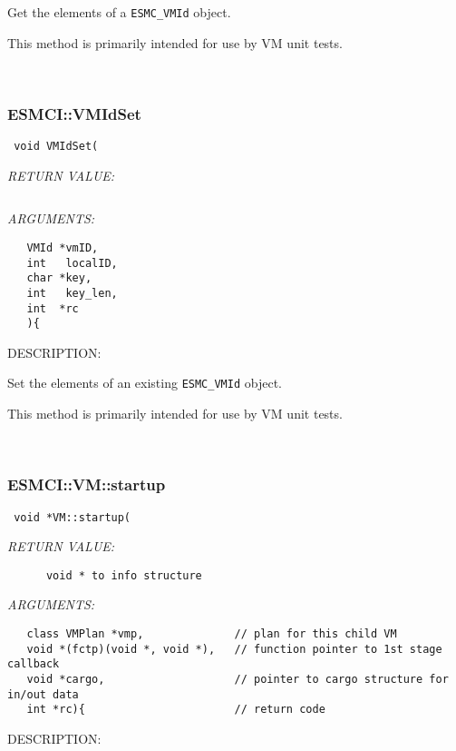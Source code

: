       Get the elements of a {\tt ESMC\_VMId} object.
  
      This method is primarily intended for use by VM unit tests.
   
 
\mbox{}\hrulefill\
 
\subsubsection [ESMCI::VMIdSet] {ESMCI::VMIdSet}


  
\begin{verbatim} void VMIdSet(\end{verbatim}{\em RETURN VALUE:}
\begin{verbatim} \end{verbatim}{\em ARGUMENTS:}
\begin{verbatim}   VMId *vmID,
   int   localID,
   char *key,
   int   key_len,
   int  *rc
   ){\end{verbatim}
{\sf DESCRIPTION:\\ }


      Set the elements of an existing {\tt ESMC\_VMId} object.
  
      This method is primarily intended for use by VM unit tests.
   
 
\mbox{}\hrulefill\
 
\subsubsection [ESMCI::VM::startup] {ESMCI::VM::startup}


  
\begin{verbatim} void *VM::startup(\end{verbatim}{\em RETURN VALUE:}
\begin{verbatim}      void * to info structure\end{verbatim}{\em ARGUMENTS:}
\begin{verbatim}   class VMPlan *vmp,              // plan for this child VM
   void *(fctp)(void *, void *),   // function pointer to 1st stage callback
   void *cargo,                    // pointer to cargo structure for in/out data
   int *rc){                       // return code\end{verbatim}
{\sf DESCRIPTION:\\ }


